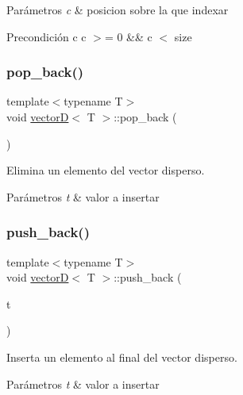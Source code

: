 \begin{DoxyParams}{Parámetros}
{\em c} & posicion sobre la que indexar \\
\hline
\end{DoxyParams}
\begin{DoxyPrecond}{Precondición}
c c $>$= 0 \&\& c $<$ size 
\end{DoxyPrecond}
\mbox{\label{classvectorD_ace854aa58e0dd93e49129ae5045c3401}} 
\subsubsection{\texorpdfstring{pop\+\_\+back()}{pop\_back()}}
{\footnotesize\ttfamily template$<$typename T$>$ \\
void \hyperlink{classvectorD}{vectorD}$<$ T $>$\+::pop\+\_\+back (\begin{DoxyParamCaption}{ }\end{DoxyParamCaption})}



Elimina un elemento del vector disperso. 


\begin{DoxyParams}{Parámetros}
{\em t} & valor a insertar \\
\hline
\end{DoxyParams}
\mbox{\label{classvectorD_a490aa6ae67bccd2cb7345e8204c703ab}} 
\subsubsection{\texorpdfstring{push\+\_\+back()}{push\_back()}}
{\footnotesize\ttfamily template$<$typename T$>$ \\
void \hyperlink{classvectorD}{vectorD}$<$ T $>$\+::push\+\_\+back (\begin{DoxyParamCaption}\item[{const T \&}]{t }\end{DoxyParamCaption})}



Inserta un elemento al final del vector disperso. 


\begin{DoxyParams}{Parámetros}
{\em t} & valor a insertar \\
\hline
\end{DoxyParams}
\mbox{\label{classvectorD_a7e8af2f1c1a56e4e0496011a662417cf}} 

